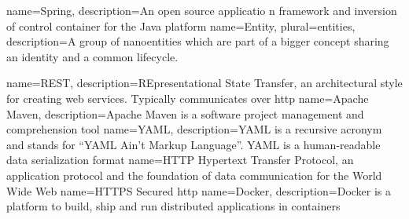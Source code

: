{
  name={Spring},
  description={An open source applicatio	n framework and inversion of control container for the Java platform}
}
{
	name={Entity},
	plural={entities},
	description={A group of nanoentities which are part of a bigger concept sharing an identity and a common lifecycle.\cite{evans2003domain}}
}

{
  name={REST},
  description={REpresentational State Transfer, an architectural style for creating web services. Typically communicates over \gls{http}}
}
{
  name={Apache Maven},
  description={Apache Maven is a software project management and comprehension tool}
}
{
  name={YAML},
  description={YAML is a recursive acronym and stands for \enquote{YAML Ain't Markup Language}. YAML is a human-readable data serialization format}
}
{
  name={HTTP}
}
{
	Hypertext Transfer Protocol, an application protocol and the foundation of data communication for the World Wide Web \cite{http_wikipedia}
}
{
  name={HTTPS}
}
{
	Secured \gls{http}
}
{
  name={Docker},
  description={Docker is a platform to build, ship and run distributed applications in containers}
}

